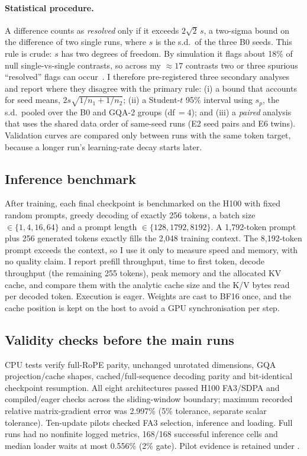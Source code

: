 \documentclass[10pt,twocolumn]{article}
\begin{document}
\paragraph{Statistical procedure.}
A difference counts as \emph{resolved} only if it exceeds $2\sqrt{2}\,s$, a two-sigma bound on the difference of two
single runs, where $s$ is the s.d.\ of the three B0 seeds. This rule is crude: $s$ has two degrees of freedom. By
simulation it flags about 18\% of null single-vs-single contrasts, so across my $\approx17$ contrasts two or three
spurious ``resolved'' flags can occur~\cite{bouthillier2021variance}. I therefore pre-registered three secondary
analyses and report where they disagree with the primary rule: (i) a bound that accounts for seed means,
$2s\sqrt{1/n_1+1/n_2}$; (ii) a Student-$t$ 95\% interval using $s_p$, the s.d.\ pooled over the B0 and GQA-2 groups
(df$\,=4$); and (iii) a \emph{paired} analysis that uses the shared data order of same-seed runs (E2 seed pairs and
E6 twins). Validation curves are compared only between runs with the same token target, because a longer run's
learning-rate decay starts later.

\subsection{Inference benchmark}
After training, each final checkpoint is benchmarked on the H100 with fixed random prompts, greedy decoding of exactly 256
tokens, a batch size $\in\{1,4,16,64\}$ and a prompt length $\in\{128, 1792, 8192\}$. A 1{,}792-token prompt plus 256
generated tokens exactly fills the 2{,}048 training context. The 8{,}192-token prompt exceeds the context, so I use it
only to measure speed and memory, with no quality claim. I report prefill throughput, time to first token, decode
throughput (the remaining 255 tokens), peak memory and the allocated KV cache, and compare them with the analytic cache
size and the K/V bytes read per decoded token. Execution is eager. Weights are cast to BF16 once, and the cache position
is kept on the host to avoid a GPU synchronisation per step.

\subsection{Validity checks before the main runs}\label{sec:validity}
CPU tests verify full-RoPE parity, unchanged unrotated dimensions, GQA projection/cache shapes, cached/full-sequence
decoding parity and bit-identical checkpoint resumption. All eight architectures passed H100 FA3/SDPA and
compiled/eager checks across the sliding-window boundary; maximum recorded relative matrix-gradient error was
2.997\% (5\% tolerance, separate scalar tolerance). Ten-update pilots checked FA3 selection, inference and loading.
Full runs had no nonfinite logged metrics, 168/168 successful inference cells and median loader waits at most 0.556\%
(2\% gate). Pilot evidence is retained under .
\end{document}
